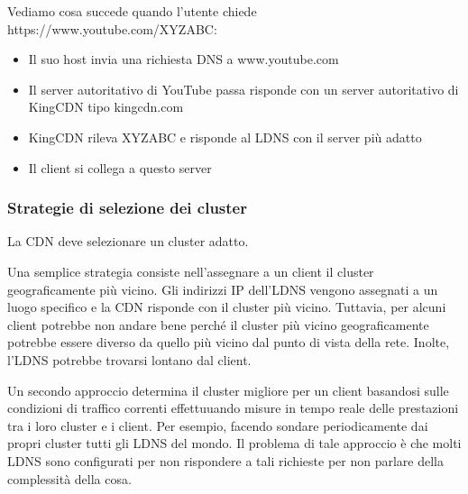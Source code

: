 \documentclass{book}
\begin{document}
Vediamo cosa succede quando l'utente chiede https://www.youtube.com/XYZABC:
\begin{itemize}
	\item Il suo host invia una richiesta DNS a www.youtube.com
	\item Il server autoritativo di YouTube passa risponde con un server autoritativo di KingCDN tipo kingcdn.com
	\item KingCDN rileva XYZABC e risponde al LDNS con il server più adatto
	\item Il client si collega a questo server
\end{itemize}

\subsubsection*{Strategie di selezione dei cluster}
La CDN deve selezionare un cluster adatto.

Una semplice strategia consiste nell'assegnare a un client il cluster geograficamente più vicino. Gli indirizzi IP dell'LDNS vengono assegnati a un luogo specifico e la CDN risponde con il cluster più vicino. Tuttavia, per alcuni client potrebbe non andare bene perché il cluster più vicino geograficamente potrebbe essere diverso da quello più vicino dal punto di vista della rete. Inolte, l'LDNS potrebbe trovarsi lontano dal client.

Un secondo approccio determina il cluster migliore per un client basandosi sulle condizioni di traffico correnti effettuuando misure in tempo reale delle prestazioni tra i loro cluster e i client. Per esempio, facendo sondare periodicamente dai propri cluster tutti gli LDNS del mondo. Il problema di tale approccio è che molti LDNS sono configurati per non rispondere a tali richieste per non parlare della complessità della cosa.
\end{document}
